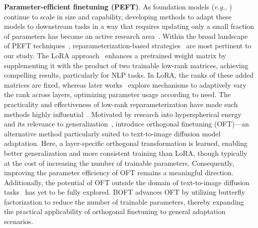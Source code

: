 \textbf{Parameter-efficient finetuning (PEFT)}. As foundation models (\emph{e.g.}, \cite{brown2020language,radford2021learning,rombach2022high,kirillov2023segment}) continue to scale in size and capability, developing methods to adapt these models to downstream tasks in a way that requires updating only a small fraction of parameters has become an active research area~\cite{treviso2023efficient,ding2023parameter,lialin2023scaling}. Within the broad landscape of PEFT techniques~\cite{houlsby2019parameter,aghajanyan2020intrinsic,hulora2022,edalati2022krona,wang2022adamix,gheini2021cross,zaken2022bitfit,guo2020parameter,sung2021training,ansell2022composable,lester2021power,li2021prefix,vu2022spot,he2021towards,mao2021unipelt,karimi2021compacter,liu2022few,sung2022lst,chen2022parameter,jia2022visual,chen2022adaptformer,zhang2022neural,jie2023fact,lian2022scaling,luo2023towards}, reparameterization-based strategies~\cite{aghajanyan2020intrinsic,hulora2022,edalati2022krona} are most pertinent to our study. The LoRA approach~\cite{hulora2022} enhances a pretrained weight matrix by supplementing it with the product of two trainable low-rank matrices, achieving compelling results, particularly for NLP tasks. In LoRA, the ranks of these added matrices are fixed, whereas later works~\cite{zhang2022adaptive,valipour2022dylora,zhang2023increlora} explore mechanisms to adaptively vary the rank across layers, optimizing parameter usage according to need. The practicality and effectiveness of low-rank reparameterization have made such methods highly influential~\cite{dettmers2023qlora,zi2023delta,chavan2023one}. Motivated by research into hyperspherical energy and its relevance to generalization~\cite{liu2018learning,liu2021orthogonal}, \cite{qiu2023controlling} introduce orthogonal finetuning (OFT)—an alternative method particularly suited to text-to-image diffusion model adaptation. Here, a layer-specific orthogonal transformation is learned, enabling better generalization and more consistent training than LoRA, though typically at the cost of increasing the number of trainable parameters. Consequently, improving the parameter efficiency of OFT remains a meaningful direction. Additionally, the potential of OFT outside the domain of text-to-image diffusion tasks~\cite{qiu2023controlling} has yet to be fully explored. BOFT advances OFT by utilizing butterfly factorization to reduce the number of trainable parameters, thereby expanding the practical applicability of orthogonal finetuning to general adaptation scenarios.


